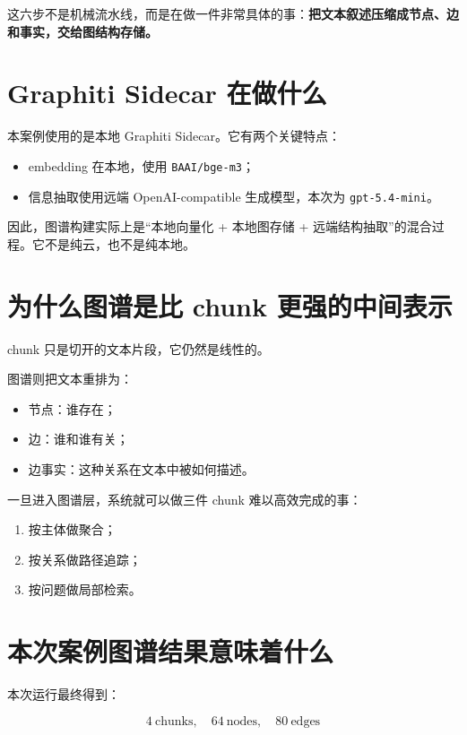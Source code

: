 \documentclass[UTF8,10pt,oneside]{ctexbook}
\newcommand{\code}[1]{\nolinkurl{#1}}
\begin{document}
这六步不是机械流水线，而是在做一件非常具体的事：\textbf{把文本叙述压缩成节点、边和事实，交给图结构存储。}

\section{Graphiti Sidecar 在做什么}

本案例使用的是本地 Graphiti Sidecar。它有两个关键特点：

\begin{itemize}
  \item embedding 在本地，使用 \code{BAAI/bge-m3}；
  \item 信息抽取使用远端 OpenAI-compatible 生成模型，本次为 \code{gpt-5.4-mini}。
\end{itemize}

因此，图谱构建实际上是“本地向量化 + 本地图存储 + 远端结构抽取”的混合过程。它不是纯云，也不是纯本地。

\section{为什么图谱是比 chunk 更强的中间表示}

chunk 只是切开的文本片段，它仍然是线性的。

图谱则把文本重排为：

\begin{itemize}
  \item 节点：谁存在；
  \item 边：谁和谁有关；
  \item 边事实：这种关系在文本中被如何描述。
\end{itemize}

一旦进入图谱层，系统就可以做三件 chunk 难以高效完成的事：

\begin{enumerate}
  \item 按主体做聚合；
  \item 按关系做路径追踪；
  \item 按问题做局部检索。
\end{enumerate}

\section{本次案例图谱结果意味着什么}

本次运行最终得到：

\[
4\ \text{chunks},\quad 64\ \text{nodes},\quad 80\ \text{edges}
\]
\end{document}
